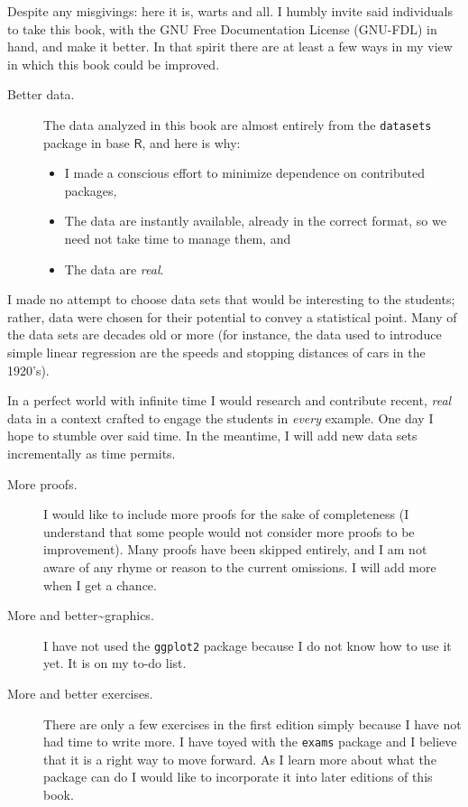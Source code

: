 Despite any misgivings: here it is, warts and all. I humbly invite said individuals to take this book, with the GNU Free Documentation License (GNU-FDL) in hand, and make it better. In that spirit there are at least a few ways in my view in which this book could be improved.

\begin{description}
\item[Better data.] The data analyzed in this book are almost entirely from the \texttt{datasets} package in base \(\mathsf{R}\), and here is why:
\begin{itemize}
\item I made a conscious effort to minimize dependence on contributed packages,
\item The data are instantly available, already in the correct format, so we need not take time to manage them, and
\item The data are \emph{real}.
\end{itemize}
\end{description}

I made no attempt to choose data sets that would be interesting to the students; rather, data were chosen for their potential to convey a statistical point. Many of the data sets are decades old or more (for instance, the data used to introduce simple linear regression are the speeds and stopping distances of cars in the 1920's).

In a perfect world with infinite time I would research and contribute recent, \emph{real} data in a context crafted to engage the students in \emph{every} example. One day I hope to stumble over said time. In the meantime, I will add new data sets incrementally as time permits.
\begin{description}
\item[More proofs.] I would like to include more proofs for the sake of completeness (I understand that some people would not consider more proofs to be improvement). Many proofs have been skipped entirely, and I am not aware of any rhyme or reason to the current omissions. I will add more when I get a chance.
\item[More and better\~{}graphics.] I have not used the \texttt{ggplot2} package \cite{Wickam2009} because I do not know how to use it yet. It is on my to-do list.
\item[More and better exercises.] There are only a few exercises in the first edition simply because I have not had time to write more. I have toyed with the \texttt{exams} package \cite{exams} and I believe that it is a right way to move forward. As I learn more about what the package can do I would like to incorporate it into later editions of this book.
\end{description}


